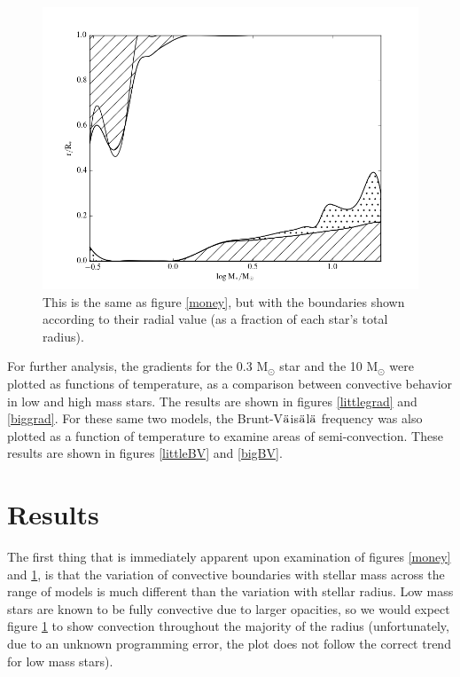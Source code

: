 \documentclass[12pt]{article}
\begin{document}
\begin{figure}
  \centering
  \includegraphics[width=7.0in]{money2.png}
  \caption{This is the same as figure \ref{money}, but with the
  boundaries shown according to their radial value (as a fraction of
  each star's total radius).}
  \label{money2}
\end{figure}
\newpage
\noindent


\noindent
For further analysis, the gradients for the 0.3 M$_{\odot}$ star
and the 10 M$_{\odot}$ were plotted as functions of temperature, as a
comparison between convective behavior in low and high mass stars.
The results are shown in figures \ref{littlegrad} and \ref{biggrad}.
For these same two models, the
Brunt-V$\ddot{\rm a}$is$\ddot{\rm a}$l$\ddot{\rm a}$
frequency was also plotted as a function of temperature
to examine areas of semi-convection. These results are shown in
figures \ref{littleBV} and \ref{bigBV}.

\section{Results}
The first thing that is immediately apparent
upon examination of figures \ref{money} and \ref{money2}, is that
the variation of convective boundaries with stellar mass across the
range of models is much different than the variation with
stellar radius.
Low mass stars are known to be fully convective due to larger
opacities, so we would expect figure \ref{money2} to show convection
throughout the majority of the radius (unfortunately, due to an
unknown
programming error, the plot does not follow the correct trend for low
mass stars).\\
\end{document}
